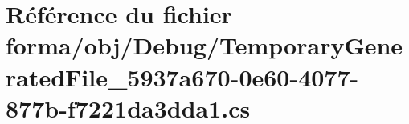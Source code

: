 \hypertarget{_temporary_generated_file__5937a670-0e60-4077-877b-f7221da3dda1_8cs}{}\section{Référence du fichier forma/obj/\+Debug/\+Temporary\+Generated\+File\+\_\+5937a670-\/0e60-\/4077-\/877b-\/f7221da3dda1.cs}
\label{_temporary_generated_file__5937a670-0e60-4077-877b-f7221da3dda1_8cs}
